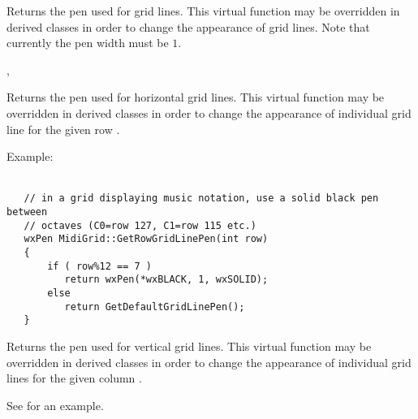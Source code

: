


\label{wxgridgetdefaultgridlinepen}


Returns the pen used for grid lines. This virtual function may be overridden in
derived classes in order to change the appearance of grid lines. Note that
currently the pen width must be $1$.


,\\




\label{wxgridgetrowgridlinepen}


Returns the pen used for horizontal grid lines. This virtual function may be
overridden in derived classes in order to change the appearance of individual
grid line for the given row .

Example: \\
\\
\begin{verbatim}
   // in a grid displaying music notation, use a solid black pen between
   // octaves (C0=row 127, C1=row 115 etc.)
   wxPen MidiGrid::GetRowGridLinePen(int row)
   {
       if ( row%12 == 7 )
          return wxPen(*wxBLACK, 1, wxSOLID);
       else 
          return GetDefaultGridLinePen();
   }
\end{verbatim}



\label{wxgridgetcolgridlinepen}


Returns the pen used for vertical grid lines. This virtual function may be
overridden in derived classes in order to change the appearance of individual
grid lines for the given column .

See  for an example.




\label{wxgridgridlinesenabled}

